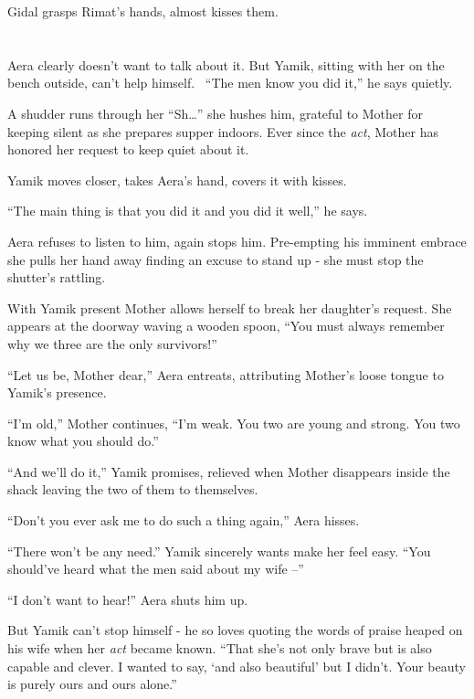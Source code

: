 \documentclass[twoside,11pt]{book}
\begin{document}
Gidal grasps Rimat's hands, almost kisses them.


\bigskip

\chapter{}

Aera clearly doesn't want to talk about it. But Yamik, sitting with her on the bench outside, can't help himself.
\ ``The men know you did it,'' he says quietly.

A shudder runs through her ``Sh{\dots}'' she hushes him, grateful to Mother for keeping
silent as she prepares supper indoors.  Ever since the \textit{act}, Mother has honored her request to keep quiet about
it.

Yamik moves closer, takes Aera's hand, covers it with kisses.

``The main thing is that you did it and you did it well,'' he says.

Aera refuses to listen to him, again stops him. Pre-empting his imminent embrace she pulls her hand
away finding an excuse to stand up - she must stop the shutter's rattling.

With Yamik present Mother allows herself to break her daughter's request. She appears at the doorway waving a wooden
spoon, ``You must always remember why we three are the only survivors!''

``Let us be, Mother dear,'' Aera entreats, attributing Mother's loose tongue to Yamik's
presence.

``I'm old,'' Mother continues, ``I'm weak. You two are young and strong. You two
know what you should do.''

``And we'll do it,'' Yamik promises, relieved when Mother disappears inside the shack leaving
the two of them to themselves.

``Don't you ever ask me to do such a thing again,'' Aera hisses.

``There won't be any need.'' Yamik sincerely wants make her feel easy. ``You
should've heard what the men said about my wife --''

``I don't want to hear!'' Aera shuts him up.

But Yamik can't stop himself - he so loves quoting the words of praise heaped on his wife when her \textit{act} became
known. ``That she's not only brave but is also capable and clever. I wanted to say, `and also beautiful'
but I didn't. Your beauty is purely ours and ours alone.''
\end{document}
